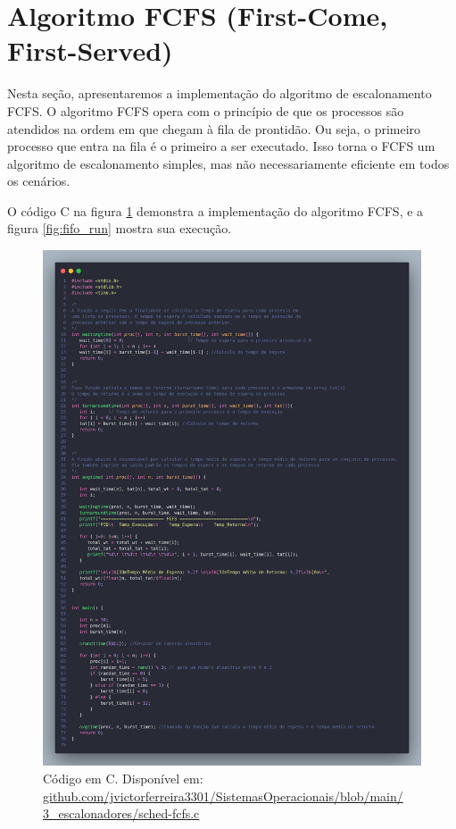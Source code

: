 \documentclass[
	12pt,				%
	openright,			%
	oneside,			%
	a4paper,			%
	chapter=TITLE,		%
	english,			%
	french,				%
	spanish,			%
	brazil				%
	]{abntex2}
\theoremstyle{definition}
\begin{document}
\section{Algoritmo FCFS (First-Come, First-Served)}

Nesta seção, apresentaremos a implementação do algoritmo de escalonamento FCFS. O algoritmo FCFS 
opera com o princípio de que os processos são atendidos na ordem em que chegam à fila de prontidão. 
Ou seja, o primeiro processo que entra na fila é o primeiro a ser executado. Isso torna o FCFS 
um algoritmo de escalonamento simples, mas não necessariamente eficiente em todos os cenários.

O código C na figura \ref{fig:fifo} demonstra a implementação do algoritmo FCFS, e a figura \ref{fig:fifo_run} mostra sua execução.

\begin{figure}[H]
    \centering
    \includegraphics[width=1.1\textwidth]{imagens/fifo_src.png}
    \caption{Código em C. Disponível em: \href{https://github.com/jvictorferreira3301/Sistemas_Operacionais/blob/main/3_escalonadores/sched-fcfs.c}{github.com/jvictorferreira3301/SistemasOperacionais/blob/main/ 3\_escalonadores/sched-fcfs.c}}
    \label{fig:fifo}
\end{figure}
\end{document}
